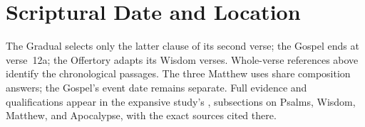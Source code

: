 \clearpage
\section{Scriptural Date and Location}


\smallskip
{\small The Gradual selects only the latter clause of its second verse; the Gospel ends at verse~12a; the Offertory adapts its Wisdom verses. Whole-verse references above identify the chronological passages. The three Matthew uses share composition answers; the Gospel's event date remains separate. Full evidence and qualifications appear in the expansive study's , subsections on Psalms, Wisdom, Matthew, and Apocalypse, with the exact sources cited there.}
\clearpage
